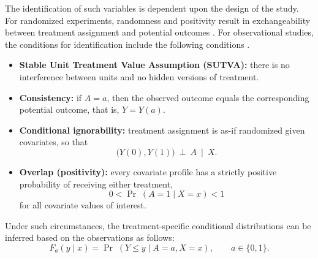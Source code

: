 \documentclass[article]{jss}\usepackage[]{graphicx}\usepackage[]{xcolor}
\begin{document}
The identification of such variables is dependent upon the design of the study. For randomized experiments, randomness and positivity result in exchangeability between treatment assignment and potential outcomes \citep{ImbensRubin2015}. For observational studies, the conditions for identification include the following conditions \citep{RosenbaumRubin1983,ImbensRubin2015}.

\begin{itemize}
\item \textbf{Stable Unit Treatment Value Assumption (SUTVA):} there
is no interference between units and no hidden versions of treatment.
\item \textbf{Consistency:} if $A=a$, then the observed outcome equals
the corresponding potential outcome, that is, $Y=Y(a)$.
\item \textbf{Conditional ignorability:} treatment assignment is
as-if randomized given covariates, so that
\begin{equation}
\bigl(Y(0),Y(1)\bigr)\ \perp\ A \ \mid\ X.
\label{eq:ignorability}
\end{equation}
\item \textbf{Overlap (positivity):} every covariate profile has a
strictly positive probability of receiving either treatment,
\begin{equation}
0<\Pr\;(A=1\mid X=x)<1
\label{eq:overlap}
\end{equation}
for all covariate values of interest.
\end{itemize}
Under such circumstances, the treatment-specific conditional
distributions can be inferred based on the observations as follows:
\begin{equation}
F_a(y\mid x)=\Pr\;(Y\le y\mid A=a,X=x),\qquad a\in\{0,1\}.
\label{eq:identification_cdf}
\end{equation}
\end{document}
